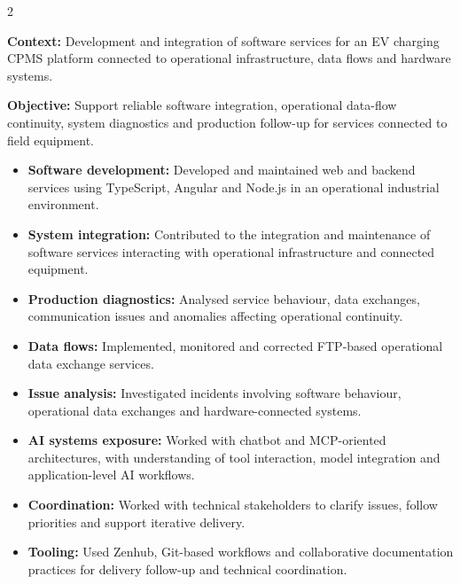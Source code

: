 \documentclass[8pt,a4paper,ragged2e,withhyper]{altacv}
\begin{document}



\makecvheader
\vspace{-0.3cm}


\begin{paracol}{2}



\textbf{Context:} Development and integration of software services for an EV charging CPMS platform connected to operational infrastructure, data flows and hardware systems.

\textbf{Objective:} Support reliable software integration, operational data-flow continuity, system diagnostics and production follow-up for services connected to field equipment.

\begin{itemize}
  \item \textbf{Software development:} Developed and maintained web and backend services using TypeScript, Angular and Node.js in an operational industrial environment.
  \item \textbf{System integration:} Contributed to the integration and maintenance of software services interacting with operational infrastructure and connected equipment.
  \item \textbf{Production diagnostics:} Analysed service behaviour, data exchanges, communication issues and anomalies affecting operational continuity.
  \item \textbf{Data flows:} Implemented, monitored and corrected FTP-based operational data exchange services.
  \item \textbf{Issue analysis:} Investigated incidents involving software behaviour, operational data exchanges and hardware-connected systems.
  \item \textbf{AI systems exposure:} Worked with chatbot and MCP-oriented architectures, with understanding of tool interaction, model integration and application-level AI workflows.
  \item \textbf{Coordination:} Worked with technical stakeholders to clarify issues, follow priorities and support iterative delivery.
  \item \textbf{Tooling:} Used Zenhub, Git-based workflows and collaborative documentation practices for delivery follow-up and technical coordination.
\end{itemize}


\end{paracol}
\end{document}
